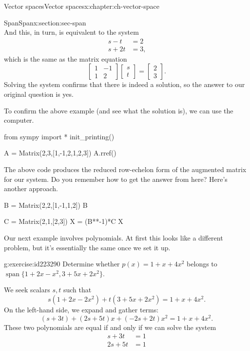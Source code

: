 \documentclass[oneside,10pt,]{book}
\numberwithin{equation}{section}
\newcommand{\spn}{\operatorname{span}}
\newcommand{\bbm}{\begin{bmatrix}}
\newcommand{\ebm}{\end{bmatrix}}
\newcommand{\amp}{&}
\begin{document}
\begin{chapterptx}{Vector spaces}{}{Vector spaces}{}{}{x:chapter:ch-vector-space}
\begin{sectionptx}{Span}{}{Span}{}{}{x:section:sec-span}
\begin{equation*}
\end{equation*}
And this, in turn, is equivalent to the system%
\begin{align*}
s -t \amp=2 \\
s+2t \amp=3 \text{,}
\end{align*}
which is the same as the matrix equation%
\begin{equation*}
\bbm 1\amp -1\\1\amp 2\ebm\bbm s\\t\ebm = \bbm 2\\3\ebm.
\end{equation*}
Solving the system confirms that there is indeed a solution, so the answer to our original question is yes.%
\par
To confirm the above example (and see what the solution is), we can use the computer.%
\begin{sageinput}
from sympy import *
init_printing()
\end{sageinput}
\begin{sageinput}
A = Matrix(2,3,[1,-1,2,1,2,3])
A.rref()
\end{sageinput}
The above code produces the reduced row-echelon form of the augmented matrix for our system. Do you remember how to get the answer from here? Here's another approach.%
\begin{sageinput}
B = Matrix(2,2,[1,-1,1,2])
B
\end{sageinput}
\begin{sageinput}
C = Matrix(2,1,[2,3])
X = (B**-1)*C
X
\end{sageinput}
Our next example involves polynomials. At first this looks like a different problem, but it's essentially the same once we set it up.%
\begin{inlineexercise}{}{g:exercise:id223290}%
Determine whether \(p(x)=1+x+4x^2\) belongs to \(\spn\{1+2x-x^2,3+5x+2x^2\}\).%
\end{inlineexercise}
We seek scalars \(s,t\) such that%
\begin{equation*}
s(1+2x-2x^2)+t(3+5x+2x^2)=1+x+4x^2\text{.}
\end{equation*}
On the left-hand side, we expand and gather terms:%
\begin{equation*}
(s+3t)+(2s+5t)x+(-2s+2t)x^2 = 1+x+4x^2\text{.}
\end{equation*}
These two polynomials are equal if and only if we can solve the system%
\begin{align*}
s+3t \amp = 1 \\
2s+5t \amp =1\\

\end{align*}
\end{sectionptx}
\end{chapterptx}
\end{document}
